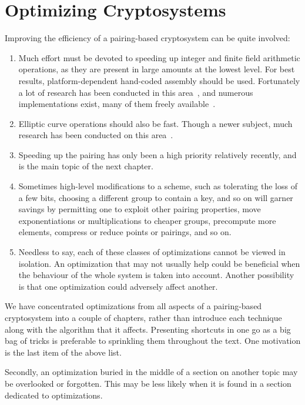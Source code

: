 \chapter{Optimizing Cryptosystems}

Improving the efficiency of a pairing-based cryptosystem can be quite involved:

\begin{enumerate}
\item
Much effort must be devoted to speeding up
integer and finite field arithmetic operations, as they are present
in large amounts at the lowest level. For best results, platform-dependent
hand-coded assembly should be used.
Fortunately a lot of research has been conducted in this area~\cite{taocp2},
and numerous implementations exist, many of them freely available~\cite{gmp, miracl}.
\item
Elliptic curve operations should also be fast. Though a newer subject,
much research has been conducted on this area~\cite{bss}.
\item
Speeding up the pairing has only been a high priority relatively recently,
and is the main topic of the next chapter.
\item
Sometimes high-level modifications to a scheme, such as tolerating the
loss of a few bits, choosing a different group to contain a key, and so on
will garner savings by permitting one to exploit other pairing properties,
move exponentiations or multiplications to cheaper groups,
precompute more elements, compress or reduce points or pairings, and so on.
\item
Needless to say, each of these classes of optimizations cannot be viewed
in isolation. An optimization that may not usually help could be beneficial
when the behaviour of the whole system is taken into account.
Another possibility is that
one optimization could adversely affect another.
\end{enumerate}

We have concentrated optimizations from all aspects of
a pairing-based cryptosystem into a couple of chapters,
rather than introduce each technique along with the algorithm that it
affects. Presenting shortcuts in one go as a big bag of tricks is
preferable to sprinkling them throughout the text.
One motivation is the last item of the above list.

Secondly, an optimization buried in the middle of a section on another topic
may be overlooked or forgotten. This may be less likely when it is found in
a section dedicated to optimizations.

